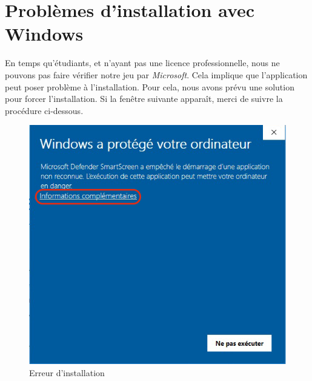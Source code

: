 \documentclass[a4paper,12pt]{article}
\begin{document}
    \section{Problèmes d'installation avec Windows}
        En temps qu'étudiants, et n'ayant pas une licence professionnelle, nous ne pouvons 
        pas faire vérifier notre jeu par \textsl{Microsoft}.
        Cela implique que l'application peut poser problème à l'installation.
        Pour cela, nous avons prévu une solution pour forcer l'installation.
        Si la fenêtre suivante apparaît, merci de suivre la procédure ci-dessous.
        \begin{figure}[h]
            \centering
            \includegraphics[scale=0.7]{error_win.png}
            \caption{Erreur d'installation}
        \end{figure}
\end{document}
